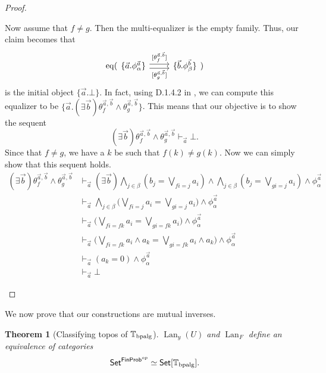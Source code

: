 \documentclass[a4paper]{amsproc}
\theoremstyle{plain}
\newtheorem{theorem}{Theorem}[section]
\theoremstyle{definition}
\theoremstyle{remark}
\numberwithin{equation}{section}
\newcommand{\y}{\textit{y}}
\DeclareMathOperator{\Lan}{Lan}
\DeclareMathOperator{\eq}{eq}
\newcommand{\Set}{\textup{\textsf{Set}}}
\newcommand{\FinProb}{\textup{\textsf{FinProb}}}
\begin{document}
\begin{proof}
\begin{enumerate}
        Now assume that $f \neq g$. Then the multi-equalizer is the empty family. Thus, our claim becomes that
        \[
            \eq(\begin{tikzcd}
                \{ \vec{a}.\phi^{\vec{a}}_{\alpha} \} \arrow[r, "{[\theta^{\vec{a},\vec{b}}_f]}", shift left] \arrow[r, "{[\theta^{\vec{a},\vec{b}}_g]}"', shift right] & \{ \vec{b}.\phi^{\vec{b}}_{\beta} \}
                \end{tikzcd})
        \]
        is the initial object $\{\vec{a}.\bot\}$. In fact, using D.1.4.2 in \cite{johnstone2002sketches2}, we can compute this equalizer to be $\{ \vec{a} . (\exists \vec{b}) \theta_f^{\vec{a},\vec{b}} \wedge \theta_g^{\vec{a},\vec{b}} \}$. This means that our objective is to show the sequent
        \[
            (\exists \vec{b}) \theta_f^{\vec{a},\vec{b}} \wedge \theta_g^{\vec{a},\vec{b}} \vdash_{\vec{a}} \bot .
        \]
        Since that $f \neq g$, we have a $k$ be such that $f(k) \neq g(k)$. Now we can simply show that this sequent holds.
        \begin{align*}
            (\exists \vec{b}) \theta_f^{\vec{a},\vec{b}} \wedge \theta_g^{\vec{a},\vec{b}}
            &\vdash_{\vec{a}} (\exists \vec{b}) \bigwedge_{j \in \beta} (b_j = \bigvee_{f i = j} a_i) \wedge \bigwedge_{j \in \beta} (b_j = \bigvee_{g i = j} a_i) \wedge \phi_{\alpha}^{\vec{a}} \\
            &\vdash_{\vec{a}} \bigwedge_{j \in \beta} \big ( \bigvee_{f i = j} a_i = \bigvee_{g i = j} a_i \big ) \wedge \phi_{\alpha}^{\vec{a}} \\
            &\vdash_{\vec{a}} \big ( \bigvee_{f i = f k} a_i = \bigvee_{g i = f k} a_i \big ) \wedge \phi_{\alpha}^{\vec{a}} \\
            &\vdash_{\vec{a}} \big ( \bigvee_{f i = f k} a_i \wedge a_k = \bigvee_{g i = f k} a_i \wedge a_k \big ) \wedge \phi_{\alpha}^{\vec{a}}\\
            &\vdash_{\vec{a}} (a_k = 0) \wedge \phi_{\alpha}^{\vec{a}} \\
            &\vdash_{\vec{a}} \bot
        \end{align*}
    \end{enumerate}
\end{proof}

We now prove that our constructions are mutual inverses.

\begin{theorem}[Classifying topos of $\mathbb{T}_{\textup{bpalg}}$] \label{classifying_presheaf}
$\Lan_{\y}(U)$ and $\Lan_F$ define an equivalence of categories
\[
\Set^{\FinProb^{op}} \simeq \Set[\mathbb{T}_{\textup{bpalg}}].
\]
\end{theorem}
\end{document}
